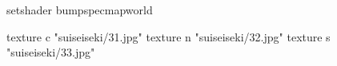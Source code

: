 setshader bumpspecmapworld

    texture c "suiseiseki/31.jpg"
    texture n "suiseiseki/32.jpg"
    texture s "suiseiseki/33.jpg"
